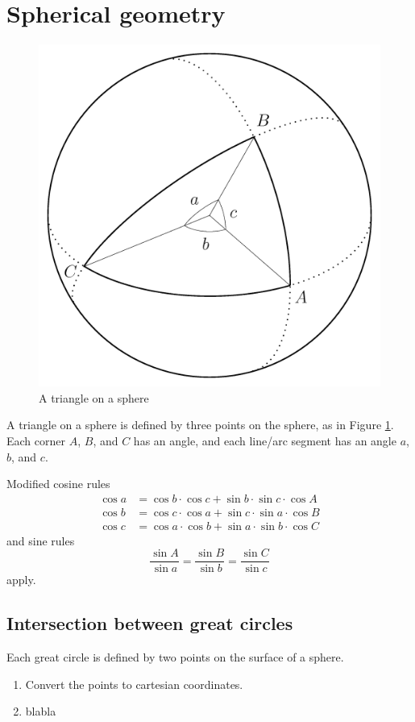 \section{Spherical geometry}

\begin{figure}[htbp]
	\centering
	\includegraphics[width=.6\linewidth]{img/spherical_triangle}
	\caption{A triangle on a sphere}
	\label{fig:spherical-triangle}
\end{figure}
A triangle on a sphere is defined by three points on the sphere, as in Figure \ref{fig:spherical-triangle}. Each corner $A$, $B$, and $C$ has an angle, and each line/arc segment has an angle $a$, $b$, and $c$.

Modified cosine rules
\begin{equation}
\begin{split}
	\cos a &= \cos b \cdot \cos c + \sin b \cdot \sin c \cdot \cos A \\
	\cos b &= \cos c \cdot \cos a + \sin c \cdot \sin a \cdot \cos B \\
	\cos c &= \cos a \cdot \cos b + \sin a \cdot \sin b \cdot \cos C
\end{split}
\end{equation}
and sine rules
\begin{equation}
	\frac{\sin A}{\sin a} = \frac{\sin B}{\sin b} = \frac{\sin C}{\sin c}
\end{equation}
apply.

\subsection{Intersection between great circles}

Each great circle is defined by two points on the surface of a sphere.
\begin{enumerate}
	\item Convert the points to cartesian coordinates.
	\item blabla
\end{enumerate}

